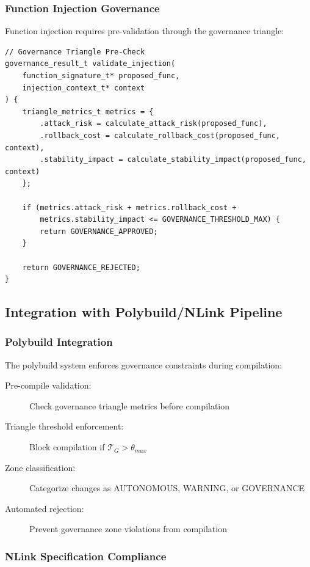 \subsubsection{Function Injection Governance}

Function injection requires pre-validation through the governance triangle:

\begin{lstlisting}[style=riftlang, language=rift]
// Governance Triangle Pre-Check
governance_result_t validate_injection(
    function_signature_t* proposed_func,
    injection_context_t* context
) {
    triangle_metrics_t metrics = {
        .attack_risk = calculate_attack_risk(proposed_func),
        .rollback_cost = calculate_rollback_cost(proposed_func, context),
        .stability_impact = calculate_stability_impact(proposed_func, context)
    };
    
    if (metrics.attack_risk + metrics.rollback_cost + 
        metrics.stability_impact <= GOVERNANCE_THRESHOLD_MAX) {
        return GOVERNANCE_APPROVED;
    }
    
    return GOVERNANCE_REJECTED;
}
\end{lstlisting}

\subsection{Integration with Polybuild/NLink Pipeline}

\subsubsection{Polybuild Integration}

The polybuild system enforces governance constraints during compilation:

\begin{description}
    \item[Pre-compile validation:] Check governance triangle metrics before compilation
    \item[Triangle threshold enforcement:] Block compilation if $\mathcal{T}_G > \theta_{max}$
    \item[Zone classification:] Categorize changes as AUTONOMOUS, WARNING, or GOVERNANCE
    \item[Automated rejection:] Prevent governance zone violations from compilation
\end{description}

\subsubsection{NLink Specification Compliance}

